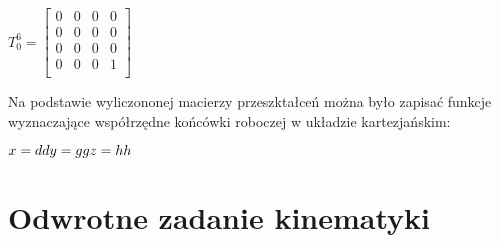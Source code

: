 $T_0^6 = 
\begin{bmatrix}
0 & 0 & 0 & 0 \\
0 & 0 & 0 & 0 \\
0 & 0 & 0 & 0 \\
0 & 0 & 0 & 1 \\
\end{bmatrix}$

\vspace{5 mm}

Na podstawie wyliczononej macierzy przeszktałceń można było zapisać funkcje wyznaczające współrzędne końcówki roboczej w układzie kartezjańskim:

\noindent
$x = dd \\
y = gg \\
z = hh \\$

\newpage
\section{Odwrotne zadanie kinematyki}
\label{sec:odwrotneZadanieKinematyki}